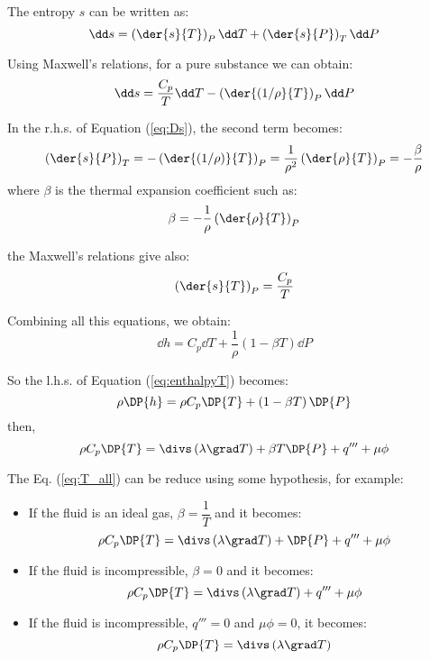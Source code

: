 The entropy $s$ can be written as:
\begin{equation}
 \dd s = \left(\der{s}{T}\right)_P \dd T + \left(\der{s}{P}\right)_T \dd P
\label{eq:Ds}
\end{equation}

Using Maxwell's relations, for a pure substance we can obtain:
\begin{equation}
 \dd s = \frac{C_p}{T} \dd T - \left( \der{(1/\rho}{T}\right)_P  \dd P
\label{eq:Ds_maxwell}
\end{equation}

In the r.h.s. of Equation (\ref{eq:Ds}), the second term becomes:
\begin{equation}
 \left(\der{s}{P}\right)_T = -\left( \der{(1/\rho)}{T}\right)_P = \frac{1}{\rho^2}\left( \der{\rho}{T}\right)_P=-\frac{\beta}{\rho}
\end{equation}
where $\beta$ is the thermal expansion coefficient such as:
\begin{equation}
 \beta= -\frac{1}{\rho}\left( \der{\rho}{T}\right)_P
\end{equation}

the Maxwell's relations give also:
\begin{equation}
 \left(\der{s}{T}\right)_P= \frac{C_p}{T}
\end{equation}

Combining all this equations, we obtain:
\begin{equation}
  \dd h=C_p \dd T + \frac{1}{\rho} \left( 1-\beta T \right)\dd P
\end{equation}

So the l.h.s. of Equation (\ref{eq:enthalpyT}) becomes:
\begin{equation}
 \rho \DP{h} = \rho C_p \DP{T} + \left( 1-\beta T \right)\DP{P}
\end{equation}
%
 then,
\begin{equation}
  \rho C_p \DP{T}=  \divs \left( \lambda \grad T \right) + \beta T \DP{P} +q''' + \mu \phi
\label{eq:T_all}
\end{equation}

The Eq. (\ref{eq:T_all}) can be reduce using some hypothesis, for example:
\begin{itemize}
 \item If the fluid is an ideal gas, $\beta=\dfrac{1}{T}$ and it becomes:
\begin{equation}
  \rho C_p \DP{T}=  \divs \left( \lambda \grad T \right) + \DP{P} +q''' + \mu \phi
\end{equation}

 \item If the fluid is incompressible, $\beta=0$ and it becomes:
\begin{equation}
  \rho C_p \DP{T}=  \divs \left( \lambda \grad T \right) +q''' + \mu \phi
\end{equation}

 \item If the fluid is incompressible, $q'''=0$ and $\mu \phi=0$,  it becomes:
\begin{equation}
  \rho C_p \DP{T}=  \divs \left( \lambda \grad T \right)
\end{equation}
\end{itemize}


